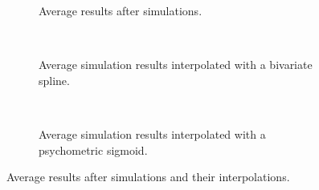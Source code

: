 \begin{multicols}{2}

\begin{figure}[H]
     \centering
    \begin{subfigure}[t]{0.41\textwidth}
        \centering
        
        \vspace{-\baselineskip}
        \caption{Average results after simulations.}
        \label{fig:sim-res}
    \end{subfigure}
    \\ \vspace{\baselineskip}
    \begin{subfigure}[t]{0.41\textwidth}
        \centering
        
        \vspace{-\baselineskip}
        \caption{Average simulation results interpolated with a bivariate spline.}
        \label{fig:sim-res-spline}
    \end{subfigure}
    \\ \vspace{\baselineskip}
    \begin{subfigure}[t]{0.41\textwidth}
        \centering
        
        \vspace{-\baselineskip}
        \caption{Average simulation results interpolated with a psychometric sigmoid.}
        \label{fig:sim-res-sigmoid}
    \end{subfigure}
    \caption[Simulation results]{Average results after simulations and their interpolations.}
    \label{fig:all-sim-res}
\end{figure}

\columnbreak


\end{multicols}
